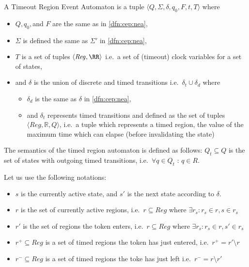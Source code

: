 			
			\begin{dfn}
				\label{dfn:cep:trea}
				A Timeout Region Event Automaton is a tuple $\langle Q,\Sigma,\delta,q_0, F, t, T \rangle$ where
				\begin{itemize}
					\item $Q, q_0,$and $F$ are the same as in \cref{dfn:cep:nea},
					\item $\Sigma$ is defined the same as $\Sigma'$ in \cref{dfn:cep:nea}, 
					
					\item $T$ is a set of tuples $\langle \mathit{Reg}, \RR \rangle$ i.e.~a set of (timeout) clock variables for a set of states,
					\item and $\delta$ is the union of discrete and timed transitions i.e.~$\delta_t \cup \delta_d$ where
					\begin{itemize}
						\item $\delta_d$ is the same as $\delta$ in \cref{dfn:cep:nea},
						\item and $\delta_t$ represents timed transitions and defined as the set of tuples $\langle \mathit{Reg} , \mathbb{R} , Q \rangle$, i.e.~a tuple which represents a timed region, the value of the maximum time which can elapse (before invalidating the state)
					\end{itemize}
					
				\end{itemize}
			\end{dfn}
			
			
			The semantics of the timed region automaton is defined as follows:
			$Q_t \subseteq Q$ is the set of states with outgoing timed transitions, 
			i.e.~$\forall q \in Q_t$ : $ q \in R $. 
			
			
			Let us use the following notations: 
			
			\begin{itemize}
				\item $s$ is the currently active state, and $s'$ is the next state according to $\delta$.		
				\item $r$ is the set of currently active regions, i.e.~$r \subseteq \mathit{Reg}$ where $\exists r_s : r_s \in r, s \in r_s $ 
				\item $r'$ is the set of regions the token enters, i.e.~$r \subseteq \mathit{Reg}$ where $\exists r_s :  r_s \in r, s' \in r_s $ 
				\item $r^+ \subseteq \mathit{Reg}$ is a set of timed regions the token has just entered, i.e.~$r^+ = r' \setminus r$ 
				\item $r^- \subseteq \mathit{Reg}$ is a set of timed regions the toke has just left i.e.~$r^- = r \setminus r'$
			\end{itemize}
			
